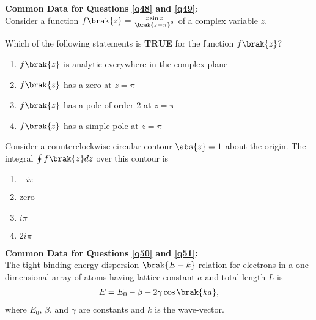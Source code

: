 \begin{multicols}{2}
\begin{enumerate}
    \end{enumerate}
\end{multicols}

\textbf{Common Data for Questions \ref{q48} and \ref{q49}}: \\
Consider a function $f\brak{z} = \frac{z \sin z}{\brak{z - \pi}^2}$ of a complex variable $z$.

\item \label{q48} Which of the following statements is \textbf{TRUE} for the function $f\brak{z}$?
\begin{enumerate}
    \item $f\brak{z}$ is analytic everywhere in the complex plane
    \item $f\brak{z}$ has a zero at $z = \pi$
    \item $f\brak{z}$ has a pole of order 2 at $z = \pi$
    \item $f\brak{z}$ has a simple pole at $z = \pi$
\end{enumerate}

\item \label{q49} Consider a counterclockwise circular contour $\abs{z} = 1$ about the origin. The integral
$\oint f\brak{z} dz$ over this contour is
\begin{multicols}{4}
    \begin{enumerate}
        \item $-i\pi$
        \item zero
        \item $i\pi$
        \item $2i\pi$
    \end{enumerate}
\end{multicols}

\textbf{Common Data for Questions \ref{q50} and \ref{q51}:} \\
The tight binding energy dispersion $\brak{E-k}$ relation for electrons in a one-dimensional
array of atoms having lattice constant $a$ and total length $L$ is 
\begin{align*}    
E = E_0 - \beta - 2\gamma \cos\brak{ka},
\end{align*}
where $E_0$, $\beta$, and $\gamma$ are constants and $k$ is the wave-vector.

